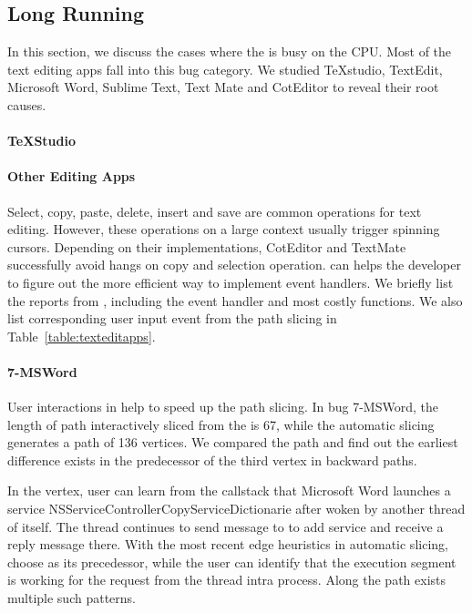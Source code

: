 \subsection{Long Running}

In this section, we discuss the cases where the \spinningnode is busy on the
CPU. Most of the text editing apps fall into this bug category. We studied
TeXstudio, TextEdit, Microsoft Word, Sublime Text, Text Mate and CotEditor to
reveal their root causes.

\paragraph{TeXStudio}


\paragraph{Other Editing Apps}

Select, copy, paste, delete, insert and save are common operations for text
editing. However, these operations on a large context usually trigger spinning
cursors. Depending on their implementations, CotEditor and TextMate successfully
avoid hangs on copy and selection operation. \xxx can helps the developer to
figure out the more efficient way to implement event handlers. We briefly list
the reports from \spinningnode, including the event handler and most costly
functions. We also list corresponding user input event from the path slicing in
Table~\ref{table:texteditapps}.


\paragraph{7-MSWord}

User interactions in \xxx help to speed up the path slicing.
In bug 7-MSWord, the length of path interactively sliced from the \spinningnode
is 67, while the automatic slicing generates a path of 136 vertices. We
compared the path and find out the earliest difference exists in the
predecessor of the third vertex in backward paths.

In the vertex, user can learn from the callstack that Microsoft Word launches a
service NSServiceControllerCopyServiceDictionarie after woken by another thread
of itself. The thread continues to send message to  to add service
and receive a reply message there. With the most recent edge heuristics in
automatic slicing, \xxx choose  as its precedessor, while the user
can identify that the execution segment is working for the request from the
thread intra process. Along the path exists multiple such patterns.

